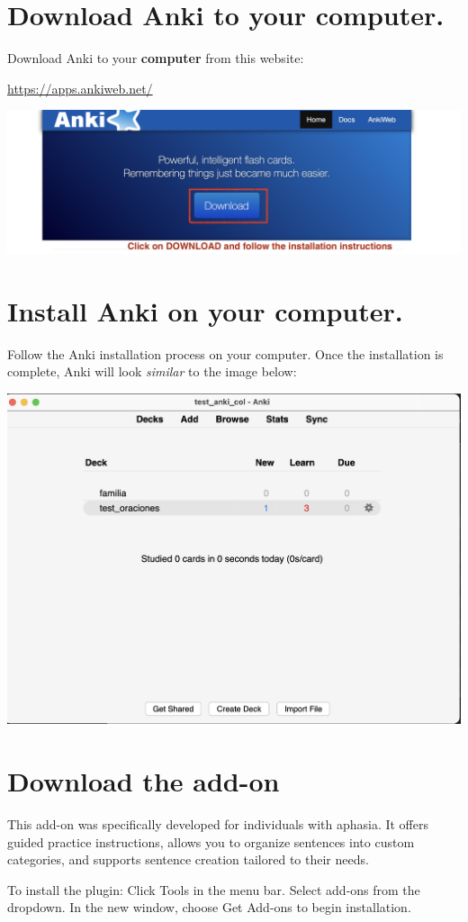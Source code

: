 \documentclass[
]{book}
\begin{document}
\section{Download Anki to your computer.}\label{download-anki-to-your-computer.}

Download Anki to your \textbf{computer} from this website:

\url{https://apps.ankiweb.net/}

\includegraphics[width=0.6\linewidth]{images/reposit_en/download}

\section{Install Anki on your computer.}\label{install-anki-on-your-computer.}

Follow the Anki installation process on your computer. Once the installation is complete, Anki will look \emph{similar} to the image below:

\includegraphics[width=0.6\linewidth]{images/reposit_en/anki_screen}

\section{Download the add-on}\label{download-the-add-on}

This add-on was specifically developed for individuals with aphasia.
It offers guided practice instructions, allows you to organize sentences into custom categories, and supports sentence creation tailored to their needs.

To install the plugin: Click Tools in the menu bar. Select add-ons from the dropdown. In the new window, choose Get Add-ons to begin installation.
\end{document}
